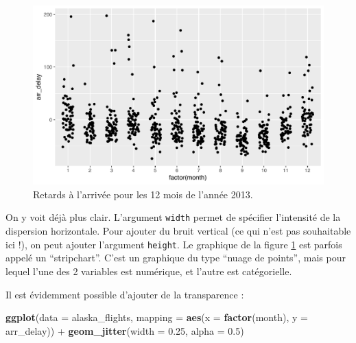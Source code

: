 \documentclass[a4paperpaper,]{article}
\newenvironment{Shaded}{\begin{snugshade}}{\end{snugshade}}
\newcommand{\DataTypeTok}[1]{\textcolor[rgb]{0.00,0.34,0.68}{#1}}
\newcommand{\FloatTok}[1]{\textcolor[rgb]{0.69,0.50,0.00}{#1}}
\newcommand{\KeywordTok}[1]{\textcolor[rgb]{0.12,0.11,0.11}{\textbf{#1}}}
\newcommand{\NormalTok}[1]{\textcolor[rgb]{0.12,0.11,0.11}{#1}}
\newcommand{\OperatorTok}[1]{\textcolor[rgb]{0.12,0.11,0.11}{#1}}
\newcommand{\StringTok}[1]{\textcolor[rgb]{0.75,0.01,0.01}{#1}}
\begin{document}
\begin{figure}[htpb]

{\centering \includegraphics[width=0.9\linewidth]{figure/jittering-1} 

}

\caption{Retards à l'arrivée pour les 12 mois de l'année 2013.}\label{fig:jittering}
\end{figure}

On y voit déjà plus clair. L'argument \texttt{width} permet de spécifier l'intensité de la dispersion horizontale. Pour ajouter du bruit vertical (ce qui n'est pas souhaitable ici !), on peut ajouter l'argument \texttt{height}. Le graphique de la figure \ref{fig:jittering} est parfois appelé un ``stripchart''. C'est un graphique du type ``nuage de points'', mais pour lequel l'une des 2 variables est numérique, et l'autre est catégorielle.

Il est évidemment possible d'ajouter de la transparence :

\begin{Shaded}
\begin{Highlighting}[]
\KeywordTok{ggplot}\NormalTok{(}\DataTypeTok{data =}\NormalTok{ alaska_flights, }
       \DataTypeTok{mapping =} \KeywordTok{aes}\NormalTok{(}\DataTypeTok{x =} \KeywordTok{factor}\NormalTok{(month), }\DataTypeTok{y =}\NormalTok{ arr_delay)) }\OperatorTok{+}
\StringTok{  }\KeywordTok{geom_jitter}\NormalTok{(}\DataTypeTok{width =} \FloatTok{0.25}\NormalTok{, }\DataTypeTok{alpha =} \FloatTok{0.5}\NormalTok{)}
\end{Highlighting}
\end{Shaded}
\end{document}
